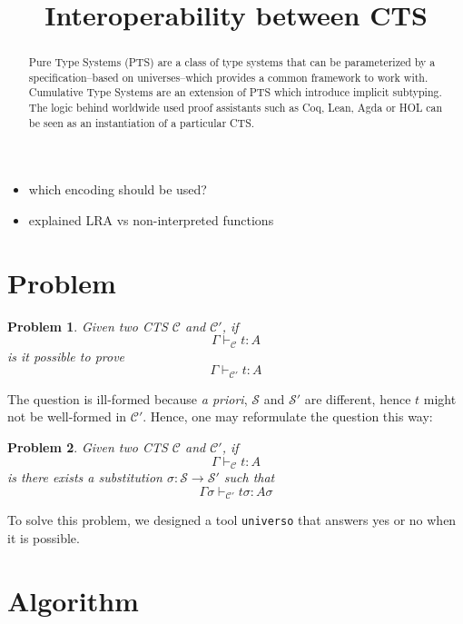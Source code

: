 \documentclass[conference]{IEEEtran}
\newtheorem{problem}{Problem}
\begin{document}
\title{Interoperability between CTS}
\author{
}
\maketitle

\begin{abstract}
Pure Type Systems (PTS) are a class of type systems that can be parameterized by a specification--based on universes--which provides a common framework to work with. Cumulative Type Systems are an extension of PTS which introduce implicit subtyping. The logic behind worldwide used proof assistants such as Coq, Lean, Agda or HOL can be seen as an instantiation of a particular CTS.
\end{abstract}

\begin{itemize}
\item which encoding should be used?
\item explained LRA vs non-interpreted functions
\end{itemize}

\section{Problem}
\begin{problem}
Given two CTS \(\mathcal{C}\) and \(\mathcal{C}'\), if
\[ \Gamma \vdash_{\mathcal{C}} t : A \]
is it possible to prove
\[ \Gamma \vdash_{\mathcal{C}'} t : A\]
\end{problem}

The question is ill-formed because \textit{a priori}, \(\mathcal{S}\) and \(\mathcal{S}'\) are different, hence \(t\) might not be well-formed in \(\mathcal{C}'\). Hence, one may reformulate the question this way:

\begin{problem}
  Given two CTS \(\mathcal{C}\) and \(\mathcal{C}'\), if
  \[ \Gamma \vdash_{\mathcal{C}} t : A \]
  is there exists a substitution \(\sigma : \mathcal{S} \to \mathcal{S}'\) such that
  \[ \Gamma\sigma \vdash_{\mathcal{C}'} t\sigma : A\sigma\]
\end{problem}

To solve this problem, we designed a tool \texttt{universo} that answers yes or no when it is possible.

\section{Algorithm}
\end{document}
